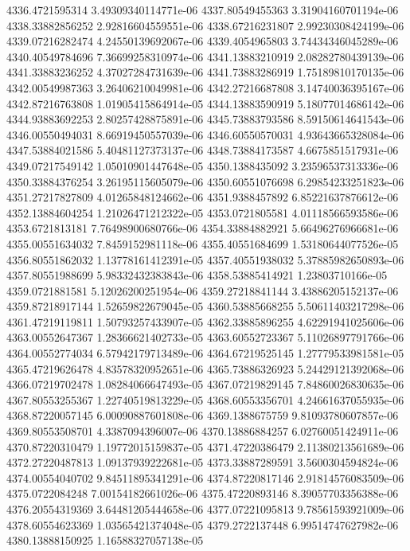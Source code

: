 {4336.4721595314 3.49309340114771e-06
4337.80549455363 3.31904160701194e-06
4338.33882856252 2.92816604559551e-06
4338.67216231807 2.99230308424199e-06
4339.07216282474 4.24550139692067e-06
4339.4054965803 3.74434346045289e-06
4340.40549784696 7.36699258310974e-06
4341.13883210919 2.08282780439139e-06
4341.33883236252 4.37027284731639e-06
4341.73883286919 1.75189810170135e-06
4342.00549987363 3.26406210049981e-06
4342.27216687808 3.14740036395167e-06
4342.87216763808 1.01905415864914e-05
4344.13883590919 5.18077014686142e-06
4344.93883692253 2.80257428875891e-06
4345.73883793586 8.59150614641543e-06
4346.00550494031 8.66919450557039e-06
4346.60550570031 4.93643665328084e-06
4347.53884021586 5.40481127373137e-06
4348.73884173587 4.6675851517931e-06
4349.07217549142 1.05010901447648e-05
4350.1388435092 3.23596537313336e-06
4350.33884376254 3.26195115605079e-06
4350.60551076698 6.29854233251823e-06
4351.27217827809 4.01265848124662e-06
4351.9388457892 6.85221637876612e-06
4352.13884604254 1.21026471212322e-05
4353.0721805581 4.01118566593586e-06
4353.6721813181 7.76498900680766e-06
4354.33884882921 5.66496276966681e-06
4355.00551634032 7.8459152981118e-06
4355.40551684699 1.53180644077526e-05
4356.80551862032 1.13778161412391e-05
4357.40551938032 5.37885982650893e-06
4357.80551988699 5.98332432383843e-06
4358.53885414921 1.23803710166e-05
4359.0721881581 5.12026200251954e-06
4359.27218841144 3.43886205152137e-06
4359.87218917144 1.52659822679045e-05
4360.53885668255 5.50611403217298e-06
4361.47219119811 1.50793257433907e-05
4362.33885896255 4.62291941025606e-06
4363.00552647367 1.28366621402733e-05
4363.60552723367 5.11026897791766e-06
4364.00552774034 6.57942179713489e-06
4364.67219525145 1.27779533981581e-05
4365.47219626478 4.83578320952651e-06
4365.73886326923 5.24429121392068e-06
4366.07219702478 1.08284066647493e-05
4367.07219829145 7.84860026830635e-06
4367.80553255367 1.22740519813229e-05
4368.60553356701 4.24661637055935e-06
4368.87220057145 6.00090887601808e-06
4369.1388675759 9.81093780607857e-06
4369.80553508701 4.3387094396007e-06
4370.13886884257 6.02760051424911e-06
4370.87220310479 1.19772015159837e-05
4371.47220386479 2.11380213561689e-06
4372.27220487813 1.09137939222681e-05
4373.33887289591 3.5600304594824e-06
4374.00554040702 9.84511895341291e-06
4374.87220817146 2.91814576083509e-06
4375.0722084248 7.00154182661026e-06
4375.47220893146 8.39057703356388e-06
4376.20554319369 3.64481205444658e-06
4377.07221095813 9.78561593921009e-06
4378.60554623369 1.03565421374048e-05
4379.2722137448 6.99514747627982e-06
4380.13888150925 1.16588327057138e-05
}
